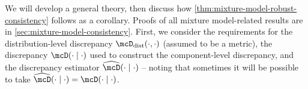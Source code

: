 We will develop a general theory, then discuss how \cref{thm:mixture-model-robust-consistency} follows 
as a corollary.
Proofs of all mixture model-related results are in \cref{sec:mixture-model-consistency}. 
First, we consider the requirements for the distribution-level discrepancy $\distDisc(\cdot, \cdot)$
(assumed to be a metric), the discrepancy $\discr{\cdot}{\cdot}$ used to construct the component-level
discrepancy, and the discrepancy estimator $\discrest{\cdot}{\cdot}$
-- noting that sometimes it will be possible to take $\discrest{\cdot}{\cdot} = \discr{\cdot}{\cdot}$.
